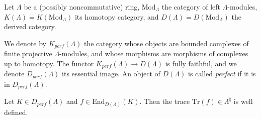 \noindent
Let $\Lambda$ be a (possibly noncommutative) ring, $\text{Mod}_{\Lambda}$ the
category of left $\Lambda$-modules, $K(\Lambda) = K(\text{Mod}_\Lambda)$ its
homotopy category, and $D(\Lambda)= D(\text{Mod}_\Lambda)$ the derived
category.

\begin{definition}
\label{definition-perfect}
We denote by $K_{perf}(\Lambda)$ the category whose objects are bounded
complexes of finite projective $\Lambda$-modules, and whose morphisms are
morphisms of complexes up to homotopy. The functor $K_{perf}(\Lambda)\to
D(\Lambda)$ is fully faithful, and we denote $D_{perf}(\Lambda)$ its essential
image. An object of $D(\Lambda)$ is called {\it perfect} if it is in
$D_{perf}(\Lambda)$.
\end{definition}

\begin{proposition}
\label{proposition-trace-well-defined}
Let $K\in D_{perf}(\Lambda)$ and $f\in \text{End}_{D(\Lambda)}(K)$. Then the
trace $\text{Tr}(f)\in \Lambda^\natural$ is well defined.
\end{proposition}


